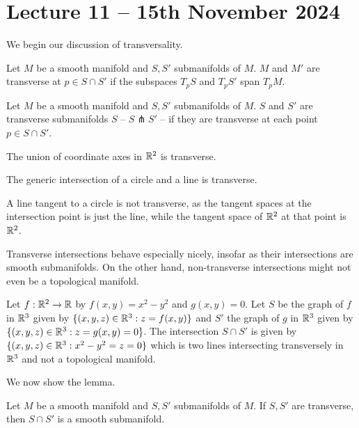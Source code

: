 \section{Lecture 11 -- 15th November 2024}\label{sec: lecture 11}
We begin our discussion of transversality. 
\begin{definition}\label{def: transverse submanifolds at a point}
    Let $M$ be a smooth manifold and $S,S'$ submanifolds of $M$. $M$ and $M'$ are transverse at $p\in S\cap S'$ if the subspaces $T_{p}S$ and $T_{p}S'$ span $T_{p}M$. 
\end{definition}
\begin{definition}\label{def: transverse submanifolds}
    Let $M$ be a smooth manifold and $S,S'$ submanifolds of $M$. $S$ and $S'$ are transverse submanifolds $S$ -- $S\pitchfork S'$ -- if they are transverse at each point $p\in S\cap S'$. 
\end{definition}
\begin{example}
    The union of coordinate axes in $\mathbb{R}^{2}$ is transverse. 
\end{example}
\begin{example}
    The generic intersection of a circle and a line is transverse. 
\end{example}
\begin{example}
    A line tangent to a circle is not transverse, as the tangent spaces at the intersection point is just the line, while the tangent space of $\mathbb{R}^{2}$ at that point is $\mathbb{R}^{2}$. 
\end{example}
Transverse intersections behave especially nicely, insofar as their intersections are smooth submanifolds. On the other hand, non-transverse intersections might not even be a topological manifold. 
\begin{example}\label{ex: graph of crossing lines}
    Let $f:\mathbb{R}^{2}\to\mathbb{R}$ by $f(x,y)=x^{2}-y^{2}$ and $g(x,y)=0$. Let $S$ be the graph of $f$ in $\mathbb{R}^{3}$ given by $\{(x,y,z)\in\mathbb{R}^{3}:z=f(x,y)\}$ and $S'$ the graph of $g$ in $\mathbb{R}^{3}$ given by $\{(x,y,z)\in\mathbb{R}^{3}:z=g(x,y)=0\}$. The intersection $S\cap S'$ is given by $\{(x,y,z)\in\mathbb{R}^{3}:x^{2}-y^{2}=z=0\}$ which is two lines intersecting transversely in $\mathbb{R}^{3}$ and not a topological manifold. 
\end{example}
We now show the lemma. 
\begin{lemma}\label{lem: transversality is a manifold}
    Let $M$ be a smooth manifold and $S,S'$ submanifolds of $M$. If $S,S'$ are transverse, then $S\cap S'$ is a smooth submanifold. 
\end{lemma}
